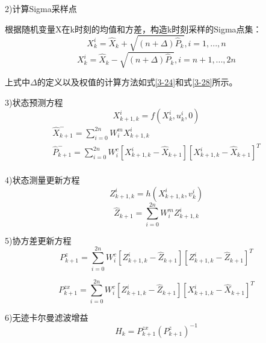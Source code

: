 2)计算Sigma采样点

根据随机变量X在k时刻的均值和方差，构造k时刻采样的Sigma点集：
\begin{equation}
X_{k}^{i}={{\widehat{X}}_{k}}+\sqrt{(n+\Delta ){{\widehat{P}}_{k}}},i=1,...,n
\end{equation}    
\begin{equation}
X_{k}^{i}={{\widehat{X}}_{k}}-\sqrt{(n+\Delta ){{\widehat{P}}_{k}}},i=n+1,...,2n
\end{equation} 

上式中$\Delta $的定义以及权值的计算方法如式\ref{3-24}和式\ref{3-28}所示。

3)状态预测方程
\begin{equation}
X_{k+1,k}^{i}=f\left( X_{k}^{i},u_{k}^{i},0 \right)
\end{equation} 
\begin{equation}
\begin{array}{l}
   \widehat{X}_{k+1}^{-}=\sum\limits_{i=0}^{2n}{W_{i}^{m}X_{k+1,k}^{i}} \\ 
  \widehat{P}_{k+1}^{-}=\sum\limits_{i=0}^{2n}{W_{i}^{c}\left[ X_{k+1,k}^{i}-{{\widehat{X}}_{k+1}} \right]}{{\left[ X_{k+1,k}^{i}-{{\widehat{X}}_{k+1}} \right]}^{T}} \\ 
\end{array}
\end{equation} 

4)状态测量更新方程
\begin{equation}
Z_{k+1,k}^{i}=h\left( X_{k+1,k}^{i},v_{k}^{i} \right)
\end{equation} 
\begin{equation}
{\widehat Z_{k + 1}} = \sum\limits_{i = 0}^{2n} {W_i^mZ_{k + 1,k}^i}
\end{equation} 

5)协方差更新方程
\begin{equation}
P_{k + 1}^z = \sum\limits_{i = 0}^{2n} {W_i^c\left[ {Z_{k + 1,k}^i - {{\widehat Z}_{k + 1}}} \right]} {\left[ {Z_{k + 1,k}^i - {{\widehat Z}_{k + 1}}} \right]^T}
\end{equation} 

\begin{equation}
P_{k + 1}^{zx} = \sum\limits_{i = 0}^{2n} {W_i^c\left[ {Z_{k + 1,k}^i - {{\widehat Z}_{k + 1}}} \right]} {\left[ {X_{k + 1,k}^i - {{\widehat X}_{k + 1}}} \right]^T}
\end{equation} 

6)无迹卡尔曼滤波增益
\begin{equation}
{H_k} = P_{k + 1}^{zx}{\left( {P_{k + 1}^z} \right)^{ - 1}}
\end{equation} 

